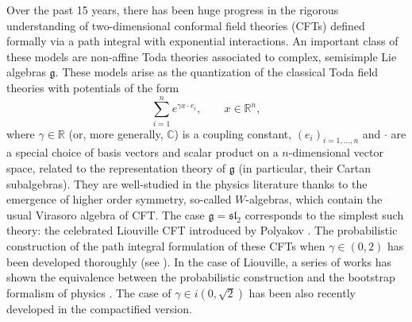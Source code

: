 \documentclass[11pt]{amsart}
\numberwithin{equation}{section}
\theoremstyle{definition}
\begin{document}
Over the past 15 years, there has been huge progress in the rigorous understanding of two-dimensional conformal field theories (CFTs) defined formally via a path integral with exponential interactions. An important class of these models are non-affine Toda theories associated to complex, semisimple Lie algebras $\mathfrak g$. These models arise as the quantization of the classical Toda field theories with potentials of the form
\begin{equation}
\sum_{i=1}^n e^{\gamma x \cdot e_i }, \qquad x \in \mathbb R^n,
\end{equation}
where $\gamma \in \mathbb R$ (or, more generally, $\mathbb C$) is a coupling constant, $(e_i)_{i=1,\dots,n}$ and $\cdot$ are a special choice of basis vectors and scalar product on a $n$-dimensional vector space, related to the representation theory of $\mathfrak g$ (in particular, their Cartan subalgebras). They are well-studied in the physics literature thanks to the emergence of higher order symmetry, so-called $W$-algebras, which contain the usual Virasoro algebra of CFT. The case $\mathfrak g = \mathfrak{sl}_2$ corresponds to the simplest such theory: the celebrated Liouville CFT introduced by Polyakov \cite{Polyakov81}. The probabilistic construction  of the path integral formulation of these CFTs when $\gamma \in (0,2)$ has been developed thoroughly (see \cite{DKRV16, GRV, CRV}). In the case of Liouville, a series of works \cite{KRV_DOZZ, GKRV,GKRV21_Segal} has shown the equivalence between the probabilistic construction and the bootstrap formalism of physics \cite{DornOtto94,Zamolodchikov96}. The case of $\gamma \in i(0,\sqrt{2})$ has been also recently developed \cite{GKR} in the compactified version.
\end{document}
